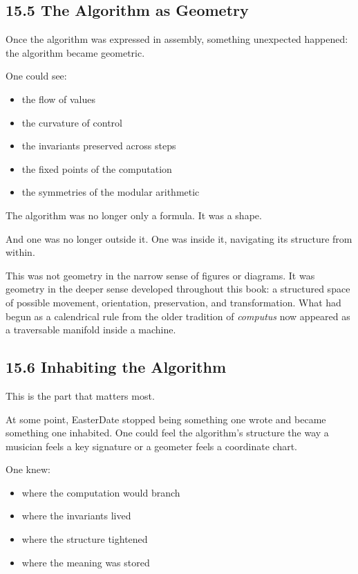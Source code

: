 \hypertarget{the-algorithm-as-geometry}{%
\subsection{15.5 The Algorithm as
Geometry}\label{the-algorithm-as-geometry}}

Once the algorithm was expressed in assembly, something unexpected
happened: the algorithm became geometric.

One could see:

\begin{itemize}
\tightlist
\item
  the flow of values
\item
  the curvature of control
\item
  the invariants preserved across steps
\item
  the fixed points of the computation
\item
  the symmetries of the modular arithmetic
\end{itemize}

The algorithm was no longer only a formula. It was a shape.

And one was no longer outside it. One was inside it, navigating its
structure from within.

This was not geometry in the narrow sense of figures or diagrams. It was
geometry in the deeper sense developed throughout this book: a
structured space of possible movement, orientation, preservation, and
transformation. What had begun as a calendrical rule from the older
tradition of \emph{computus} now appeared as a traversable manifold
inside a machine.

\hypertarget{inhabiting-the-algorithm}{%
\subsection{15.6 Inhabiting the
Algorithm}\label{inhabiting-the-algorithm}}

This is the part that matters most.

At some point, EasterDate stopped being something one wrote and became
something one inhabited. One could feel the algorithm's structure the
way a musician feels a key signature or a geometer feels a coordinate
chart.

One knew:

\begin{itemize}
\tightlist
\item
  where the computation would branch
\item
  where the invariants lived
\item
  where the structure tightened
\item
  where the meaning was stored
\end{itemize}

